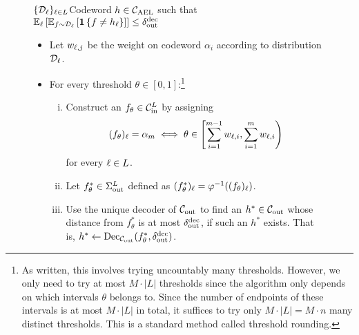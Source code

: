 \begin{figure}[!ht]
\begin{algorithm}{\DECODE}{$\{{\mathcal D}_{{ \ell }}\}_{{ \ell }\in L}$}{Codeword $h\in { {\mathcal C}_{\mathrm{AEL}} }$ such that $\Ex{\li}{\Ex{f\sim \calD_{\li}}{\indi{f\neq h_{\li}}}} \leq \delta_{\out}^{\dec}$}
\label{algo:unique-decoding}
%
\begin{itemize}
%
	\item Let $w_{{ \ell },j}$ be the weight on codeword $\alpha_i$ according to distribution ${\mathcal D}_{{ \ell }}$.
	\item For every threshold $\theta \in [0,1]$:\footnote{As written, this involves trying uncountably many thresholds. However, we only need to try at most $M \cdot |L|$ thresholds since the algorithm only depends on which intervals $\theta$ belongs to. Since the number of endpoints of these intervals is at most $M\cdot |L|$ in total, it suffices to try only $M\cdot |L| = M\cdot n$ many distinct thresholds. This is a standard method called threshold rounding.}
			\begin{enumerate}[(i)]
				\item Construct an $f_{\theta} \in {\mathcal C}_{\mathrm{in}}^L$ by assigning 
				\[(f_{\theta})_{{ \ell }} = \alpha_m  \iff \theta \in \left[ \sum_{i=1}^{m-1} w_{{ \ell }, i}, \sum_{i=1}^{m} w_{{ \ell },i} \right)\]
				for every ${ \ell } \in L$.
				\item Let $f_\theta^* \in \Sigma_{\mathrm{out}}^L$ defined as $(f_{\theta}^*)_{{ \ell }} = \varphi^{-1}((f_{\theta})_{{ \ell }})$. 
				\item Use the unique decoder of ${\mathcal C}_{\mathrm{out}}$ to find an $h^* \in {\mathcal C}_{\mathrm{out}}$ whose distance from $f_{\theta}^*$ is at most $\delta_{\mathrm{out}}^{\mathrm{dec}}$, if such an $h^*$ exists. That is, $h^* \leftarrow \mathrm{Dec}_{{\mathcal C}_{\mathrm{out}}}(f_{\theta}^*,\delta_{\mathrm{out}}^{\mathrm{dec}})$.

\end{enumerate}
\end{itemize}
\end{algorithm}
\end{figure}
